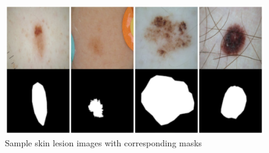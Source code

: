 \begin{figure}
    \centerline{\includegraphics[width=1\columnwidth]{02-related-works/figures/sample-medical-images-with-masks.jpeg}}
    \caption{ Sample skin lesion images with corresponding masks }
    \label{fig:sample-medical-images-with-masks}
\end{figure}